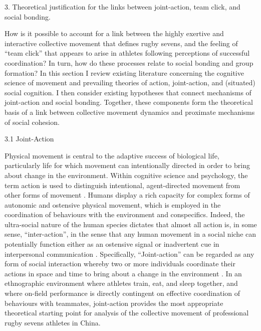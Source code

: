 
\usepackage[english]{babel}
\usepackage[backend=bibtex,style=apa,natbib=true]{biblatex}










  3. Theoretical justification for the links between joint-action, team click, and social bonding.


How is it possible to account for a link between the highly exertive and interactive collective movement that defines rugby sevens, and the feeling of ``team click'' that appears to arise in athletes following perceptions of successful coordination? In turn, how do these processes relate to social bonding and group formation?  In this section I review existing literature concerning the cognitive science of movement and prevailing theories of action, joint-action, and (situated) social cognition.  I then consider existing hypotheses that connect mechanisms of joint-action and social bonding.  Together, these components form the theoretical basis of a link between collective movement dynamics and proximate mechanisms of social cohesion.


    3.1 Joint-Action

Physical movement is central to the adaptive success of biological life, particularly life for which movement can intentionally directed in order to bring about change in the environment.  Within cognitive science and psychology, the term action is used to distinguish intentional, agent-directed movement from other forms of movement \citep{Davidson1980}.  Humans display a rich capacity for complex forms of autonomic and ostensive physical movement, which is employed in the coordination of behaviours with the environment and conspecifics.  Indeed, the ultra-social nature of the human species dictates that almost all action is, in some sense, ``inter-action'', in the sense that any human movement in a social niche can potentially function either as an ostensive signal or inadvertent cue in interpersonal communication \citep{Danchin2004}. Specifically, ``Joint-action'' can be regarded as any form of social interaction whereby two or more individuals coordinate their actions in space and time to bring about a change in the environment \citep{Sebanz2006a}.  In an ethnographic environment where athletes train, eat, and sleep together, and where on-field performance is directly contingent on effective coordination of behaviours with teammates, joint-action provides the most appropriate theoretical starting point for analysis of the collective movement of professional rugby sevens athletes in China.

